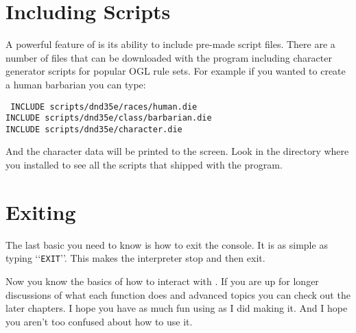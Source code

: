 \section{Including Scripts}
\label{firstInclude}
A powerful feature of \progLogo is its ability to include pre-made script
files. There are a number of files that can be downloaded with the program
including character generator scripts for popular OGL rule sets. For example
if you wanted to create a human barbarian you can type:

\noindent\texttt{%
INCLUDE scripts/dnd35e/races/human.die\\
INCLUDE scripts/dnd35e/class/barbarian.die\\
INCLUDE scripts/dnd35e/character.die
}

And the character data will be printed to the screen.
Look in the directory where you installed \progLogo to see all the scripts
that shipped with the program.

\section{Exiting}
\label{firstConsole}
The last basic you need to know is how to exit the console. It is as simple
as typing \lq\lq\texttt{EXIT}\rq\rq. This makes the interpreter stop and
then exit.

Now you know the basics of how to interact with \progLogo. If you are up for
longer discussions of what each function does and advanced topics you can check
out the later chapters. I hope you have as much fun using \progLogo as I did
making it. And I hope you aren't too confused about how to use it.



